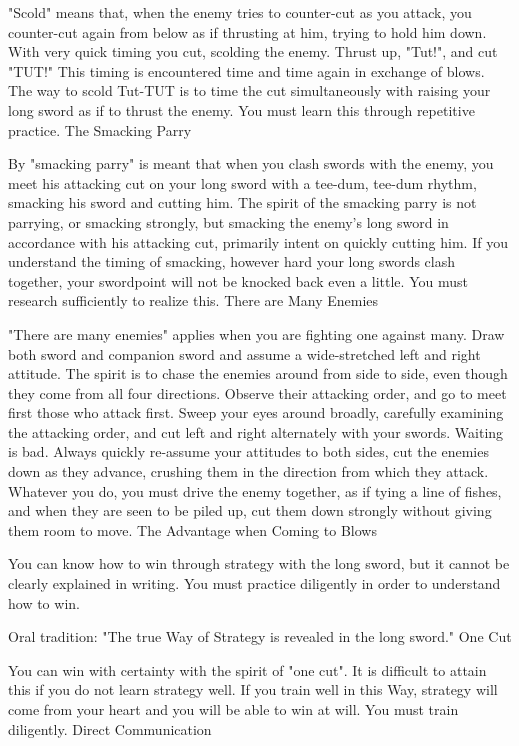 "Scold" means that, when the enemy tries to counter-cut as you attack, you counter-cut again from below as if thrusting at him, trying to hold him down. With very quick timing you cut, scolding the enemy. Thrust up, "Tut!", and cut "TUT!" This timing is encountered time and time again in exchange of blows. The way to scold Tut-TUT is to time the cut simultaneously with raising your long sword as if to thrust the enemy. You must learn this through repetitive practice.
The Smacking Parry

By "smacking parry" is meant that when you clash swords with the enemy, you meet his attacking cut on your long sword with a tee-dum, tee-dum rhythm, smacking his sword and cutting him. The spirit of the smacking parry is not parrying, or smacking strongly, but smacking the enemy's long sword in accordance with his attacking cut, primarily intent on quickly cutting him. If you understand the timing of smacking, however hard your long swords clash together, your swordpoint will not be knocked back even a little. You must research sufficiently to realize this.
There are Many Enemies

"There are many enemies" applies when you are fighting one against many. Draw both sword and companion sword and assume a wide-stretched left and right attitude. The spirit is to chase the enemies around from side to side, even though they come from all four directions. Observe their attacking order, and go to meet first those who attack first. Sweep your eyes around broadly, carefully examining the attacking order, and cut left and right alternately with your swords. Waiting is bad. Always quickly re-assume your attitudes to both sides, cut the enemies down as they advance, crushing them in the direction from which they attack. Whatever you do, you must drive the enemy together, as if tying a line of fishes, and when they are seen to be piled up, cut them down strongly without giving them room to move.
The Advantage when Coming to Blows

You can know how to win through strategy with the long sword, but it cannot be clearly explained in writing. You must practice diligently in order to understand how to win.

Oral tradition: "The true Way of Strategy is revealed in the long sword."
One Cut

You can win with certainty with the spirit of "one cut". It is difficult to attain this if you do not learn strategy well. If you train well in this Way, strategy will come from your heart and you will be able to win at will. You must train diligently.
Direct Communication

